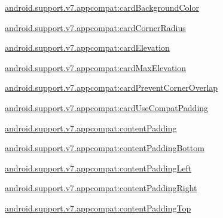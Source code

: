 {\ttfamily \hyperlink{classandroid_1_1support_1_1v7_1_1appcompat_1_1R_1_1styleable_acb24166fe6ace1e27e74e078d21add57}{android.\+support.\+v7.\+appcompat\+:card\+Background\+Color}}

{\ttfamily \hyperlink{classandroid_1_1support_1_1v7_1_1appcompat_1_1R_1_1styleable_aeaecb06443390ab0adc287eaf8376de8}{android.\+support.\+v7.\+appcompat\+:card\+Corner\+Radius}}

{\ttfamily \hyperlink{classandroid_1_1support_1_1v7_1_1appcompat_1_1R_1_1styleable_ae06791ca725d44a4ad44afc35ef9fd36}{android.\+support.\+v7.\+appcompat\+:card\+Elevation}}

{\ttfamily \hyperlink{classandroid_1_1support_1_1v7_1_1appcompat_1_1R_1_1styleable_a8c5ed09c377e83d942b47c13e8f01e50}{android.\+support.\+v7.\+appcompat\+:card\+Max\+Elevation}}

{\ttfamily \hyperlink{classandroid_1_1support_1_1v7_1_1appcompat_1_1R_1_1styleable_ad6fbcf3bd5eaf04f6d84e580634fbbda}{android.\+support.\+v7.\+appcompat\+:card\+Prevent\+Corner\+Overlap}}

{\ttfamily \hyperlink{classandroid_1_1support_1_1v7_1_1appcompat_1_1R_1_1styleable_a1a6356bd6696f8ac7e1e285c83dd4fe4}{android.\+support.\+v7.\+appcompat\+:card\+Use\+Compat\+Padding}}

{\ttfamily \hyperlink{classandroid_1_1support_1_1v7_1_1appcompat_1_1R_1_1styleable_a36926c090c4a75eb729564a1baa98a51}{android.\+support.\+v7.\+appcompat\+:content\+Padding}}

{\ttfamily \hyperlink{classandroid_1_1support_1_1v7_1_1appcompat_1_1R_1_1styleable_ad74f332eb543e2022b522e83a8f03c3a}{android.\+support.\+v7.\+appcompat\+:content\+Padding\+Bottom}}

{\ttfamily \hyperlink{classandroid_1_1support_1_1v7_1_1appcompat_1_1R_1_1styleable_addee01cbb7403da18fb72955d0892654}{android.\+support.\+v7.\+appcompat\+:content\+Padding\+Left}}

{\ttfamily \hyperlink{classandroid_1_1support_1_1v7_1_1appcompat_1_1R_1_1styleable_a43d4e86a2f022aedbbe56703d2f7dc0e}{android.\+support.\+v7.\+appcompat\+:content\+Padding\+Right}}

{\ttfamily \hyperlink{classandroid_1_1support_1_1v7_1_1appcompat_1_1R_1_1styleable_a0e2d945fc1d11acbc555543a3d7be2bf}{android.\+support.\+v7.\+appcompat\+:content\+Padding\+Top}}

